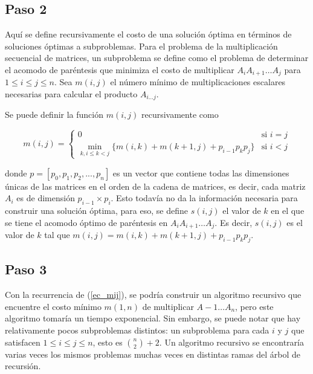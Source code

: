 \documentclass{article}
\newcommand*{\comb}[2]{\binom #1#2}%
\begin{document}
\subsection*{Paso 2}

Aquí se define recursivamente el costo de una solución óptima en términos de soluciones óptimas a subproblemas. Para el problema de la multiplicación secuencial de matrices, un subproblema se define como el problema de determinar el acomodo de paréntesis que minimiza el costo de multiplicar $A_i A_{i + 1} \hdots A_j$ para $1 \leq i \leq j \leq n$. Sea $m(i, j)$ el número mínimo de multiplicaciones escalares necesarias para calcular el producto $A_{i \hdots j}$.

Se puede definir la función $m(i,j)$ recursivamente como

\begin{equation}
\label{ec_mij}
m(i,j) = \left\{
	\begin{array}{ll}
		0                                                               & \mbox{si } i = j \\
		\min_{k, i \le k < j} \{ m(i,k) + m(k+1,j) + p_{i-1} p_k p_j \} & \mbox{si } i < j
	\end{array}
\right.
\end{equation}

donde $p = \left[ p_0, p_1, p_2, ..., p_n \right]$ es un vector que contiene todas las dimensiones únicas de las matrices en el orden de la cadena de matrices, es decir, cada matriz $A_i$ es de dimensión $p_{i-1} \times p_i$. Esto todavía no da la información necesaria para construir una solución óptima, para eso, se define $s(i, j)$ el valor de $k$ en el que se tiene el acomodo óptimo de paréntesis en $A_i A_{i + 1} \hdots A_j$. Es decir, $s(i, j)$ es el valor de $k$ tal que $m(i, j) = m(i,k) + m(k+1,j) + p_{i-1} p_k p_j$.
 
\subsection*{Paso 3}

Con la recurrencia de (\ref{ec_mij}), se podría construir un algoritmo recursivo que encuentre el costo mínimo $m(1, n)$ de multiplicar $A-1 \hdots A_n$, pero este algoritmo tomaría un tiempo exponencial. Sin embargo, se puede notar que hay relativamente pocos subproblemas distintos: un subproblema para cada $i$  y $j$ que satisfacen $1 \leq i \leq j \leq n$, esto es $\comb{n}{2} + 2$. Un algoritmo recursivo se encontraría varias veces los mismos problemas muchas veces en distintas ramas del árbol de recursión.
\end{document}

